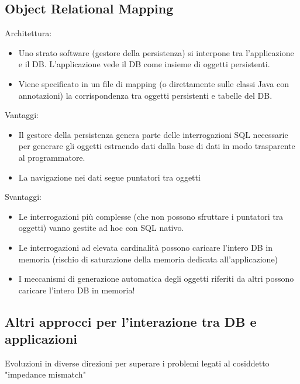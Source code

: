 \documentclass[a4paper, 10pt]{article}
\theoremstyle{definition}
\begin{document}
	\subsection{Object Relational Mapping}
		Architettura:
		\begin{itemize}
			\item Uno strato software (gestore della persistenza) si
			interpone tra l’applicazione e il DB. L’applicazione vede
			il DB come insieme di oggetti persistenti.
			\item Viene specificato in un file di mapping (o direttamente
			sulle classi Java con annotazioni) la corrispondenza tra
			oggetti persistenti e tabelle del DB.
		\end{itemize}
		Vantaggi:
		\begin{itemize}
			\item Il gestore della persistenza genera parte delle interrogazioni SQL necessarie per
			generare gli oggetti estraendo dati dalla base di dati in modo trasparente al
			programmatore.
			\item La navigazione nei dati segue puntatori tra oggetti
		\end{itemize}
		Svantaggi:
		\begin{itemize}
			\item Le interrogazioni più complesse (che non possono sfruttare i puntatori tra
			oggetti) vanno gestite ad hoc con SQL nativo.
			\item Le interrogazioni ad elevata cardinalità possono caricare l’intero DB in
			memoria (rischio di saturazione della memoria dedicata all’applicazione)
			\item I meccanismi di generazione automatica degli oggetti riferiti da altri possono
			caricare l’intero DB in memoria!
		\end{itemize}
		
	\subsection*{Altri approcci per l’interazione tra DB e applicazioni}
		Evoluzioni in diverse direzioni per superare i problemi legati al cosiddetto
		"impedance mismatch"
		
\end{document}
